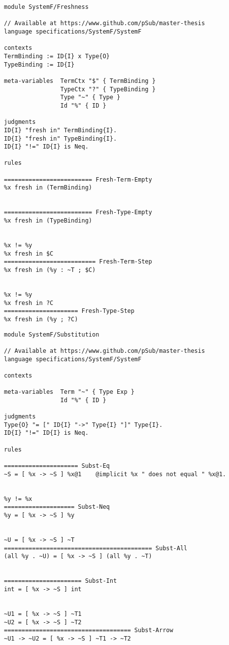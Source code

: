 \newpage
\begin{lstlisting}[language=sltc]
module SystemF/Freshness

// Available at https://www.github.com/pSub/master-thesis
language specifications/SystemF/SystemF

contexts
TermBinding := ID{I} x Type{O}
TypeBinding := ID{I}

meta-variables  TermCtx "$" { TermBinding }
                TypeCtx "?" { TypeBinding }
                Type "~" { Type }
                Id "%" { ID }

judgments 
ID{I} "fresh in" TermBinding{I}.
ID{I} "fresh in" TypeBinding{I}.
ID{I} "!=" ID{I} is Neq.

rules

========================= Fresh-Term-Empty
%x fresh in (TermBinding)


========================= Fresh-Type-Empty
%x fresh in (TypeBinding)


%x != %y
%x fresh in $C
========================== Fresh-Term-Step
%x fresh in (%y : ~T ; $C)


%x != %y
%x fresh in ?C
===================== Fresh-Type-Step
%x fresh in (%y ; ?C)
\end{lstlisting}
\newpage
\begin{lstlisting}[language=sltc]
module SystemF/Substitution

// Available at https://www.github.com/pSub/master-thesis
language specifications/SystemF/SystemF

contexts

meta-variables  Term "~" { Type Exp }
                Id "%" { ID }

judgments
Type{O} "= [" ID{I} "->" Type{I} "]" Type{I}.
ID{I} "!=" ID{I} is Neq.

rules

===================== Subst-Eq
~S = [ %x -> ~S ] %x@1    @implicit %x " does not equal " %x@1.


%y != %x
==================== Subst-Neq
%y = [ %x -> ~S ] %y


~U = [ %x -> ~S ] ~T
========================================== Subst-All
(all %y . ~U) = [ %x -> ~S ] (all %y . ~T)


====================== Subst-Int
int = [ %x -> ~S ] int


~U1 = [ %x -> ~S ] ~T1
~U2 = [ %x -> ~S ] ~T2
==================================== Subst-Arrow
~U1 -> ~U2 = [ %x -> ~S ] ~T1 -> ~T2
\end{lstlisting}

